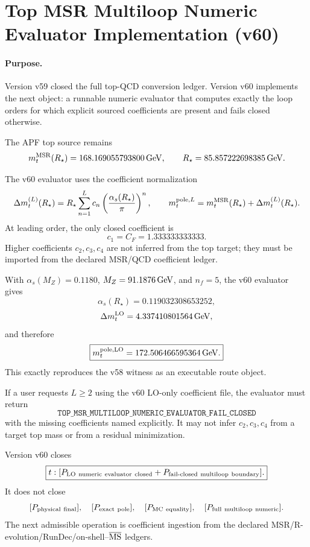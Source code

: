 
\section{Top MSR Multiloop Numeric Evaluator Implementation (v60)}

\paragraph{Purpose.}
Version v59 closed the full top-QCD conversion ledger. Version v60 implements the next object: a runnable numeric evaluator that computes exactly the loop orders for which explicit sourced coefficients are present and fails closed otherwise.

\begin{definition}
The APF top source remains
\[
 m_t^{\rm MSR}(R_\star)=168.169055793800\,{\rm GeV},
 \qquad
 R_\star=85.857222698385\,{\rm GeV}.
\]
\end{definition}

\begin{definition}
The v60 evaluator uses the coefficient normalization
\[
 \Delta m_t^{(L)}(R_\star)
 =R_\star\sum_{n=1}^L c_n\left({\alpha_s(R_\star)\over \pi}\right)^n,
 \qquad
 m_t^{{\rm pole},L}=m_t^{\rm MSR}(R_\star)+\Delta m_t^{(L)}(R_\star).
\]
At leading order, the only closed coefficient is
\[
 c_1=C_F=1.333333333333.
\]
Higher coefficients \(c_2,c_3,c_4\) are not inferred from the top target; they must be imported from the declared MSR/QCD coefficient ledger.
\end{definition}

\begin{theorem}
With \(\alpha_s(M_Z)=0.1180\), \(M_Z=91.1876\,{\rm GeV}\), and \(n_f=5\), the v60 evaluator gives
\[
 \alpha_s(R_\star)=0.119032308653252,
\]
\[
 \Delta m_t^{\rm LO}=4.337410801564\,{\rm GeV},
\]
and therefore
\[
 \boxed{m_t^{\rm pole,LO}=172.506466595364\,{\rm GeV}.}
\]
This exactly reproduces the v58 witness as an executable route object.
\end{theorem}

\begin{theorem}
If a user requests \(L\ge2\) using the v60 LO-only coefficient file, the evaluator must return
\[
 \texttt{TOP\_MSR\_MULTILOOP\_NUMERIC\_EVALUATOR\_FAIL\_CLOSED}
\]
with the missing coefficients named explicitly. %
It may not infer \(c_2,c_3,c_4\) from a target top mass or from a residual minimization.
\end{theorem}

\begin{corollary}
Version v60 closes
\[
 \boxed{t:[P_{\rm LO\ numeric\ evaluator\ closed}+P_{\rm fail\text{-}closed\ multiloop\ boundary}].}
\]
It does not close
\[
 [P_{\rm physical\ final}],\quad [P_{\rm exact\ pole}],\quad [P_{\rm MC\ equality}],\quad [P_{\rm full\ multiloop\ numeric}].
\]
The next admissible operation is coefficient ingestion from the declared MSR/R-evolution/RunDec/on-shell--\(\overline{\rm MS}\) ledgers.
\end{corollary}
